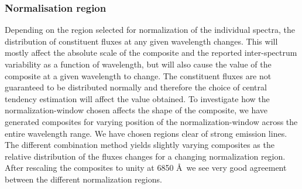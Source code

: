 \documentclass{aa}    %
\newcommand{\sectlabel}[1]{\label{sect:#1}}
\begin{document}
{\subsubsection{Normalisation region}  \sectlabel{Normalisation region}
Depending on the region selected for normalization of the individual spectra, the distribution of constituent fluxes at any given wavelength changes. This will mostly affect the absolute scale of the composite and the reported inter-spectrum variability as a function of wavelength, but will also cause the value of the composite at a given wavelength to change. The constituent fluxes are not guaranteed to be distributed normally and therefore the choice of central tendency estimation will affect the value obtained. To investigate how the normalization-window chosen affects the shape of the composite, we have generated composites for varying position of the normalization-window across the entire wavelength range. We have chosen regions clear of strong emission lines. The different combination method yields slightly varying composites as the relative distribution of the fluxes changes for a changing normalization region. After rescaling the composites to unity at 6850 \AA~we see very good agreement between the different normalization regions. 

}
\end{document}
